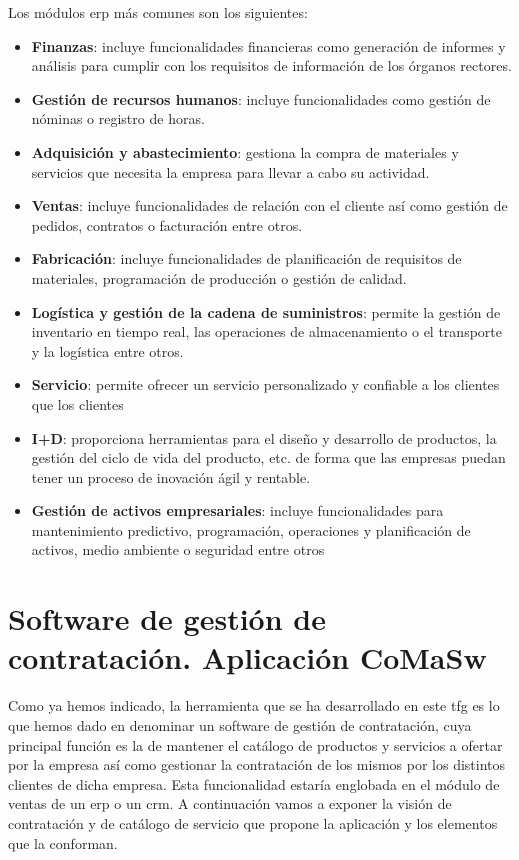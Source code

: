 Los módulos \acrshort{erp} más comunes son los siguientes\cite{SapERP}:
\begin{itemize}
\item \textbf{Finanzas}: incluye funcionalidades financieras como generación de informes y análisis para cumplir con los requisitos de información de los órganos rectores.
\item \textbf{Gestión de recursos humanos}: incluye funcionalidades como gestión de nóminas o registro de horas.
\item \textbf{Adquisición y abastecimiento}: gestiona la compra de materiales y servicios que necesita la empresa para llevar a cabo su actividad.
\item \textbf{Ventas}: incluye funcionalidades de relación con el cliente así como gestión de pedidos, contratos o facturación entre otros.
\item \textbf{Fabricación}: incluye funcionalidades de planificación de requisitos de materiales, programación de producción o gestión de calidad.
\item \textbf{Logística y gestión de la cadena de suministros}: permite la gestión de inventario en tiempo real, las operaciones de almacenamiento o el transporte y la logística entre otros.
\item \textbf{Servicio}: permite ofrecer un servicio personalizado y confiable a los clientes que los clientes
\item \textbf{I+D}: proporciona herramientas para el diseño y desarrollo de productos, la gestión del ciclo de vida del producto, etc. de forma que las empresas puedan tener un proceso de inovación ágil y rentable.
\item \textbf{Gestión de activos empresariales}: incluye funcionalidades para mantenimiento predictivo, programación, operaciones y planificación de activos, medio ambiente o seguridad entre otros
\end{itemize}


\section{Software de gestión de contratación. Aplicación CoMaSw}

Como ya hemos indicado, la herramienta que se ha desarrollado en este \acrshort{tfg} es lo que hemos dado en denominar un software de gestión de contratación, cuya principal función es la de mantener el catálogo de productos y servicios a ofertar por la empresa así como gestionar la contratación de los mismos por los distintos clientes de dicha empresa. Esta funcionalidad estaría englobada en el módulo de ventas de un \acrshort{erp} o un \acrshort{crm}. A continuación vamos a exponer la visión de contratación  y de catálogo de servicio que propone la aplicación y los elementos que la conforman.

